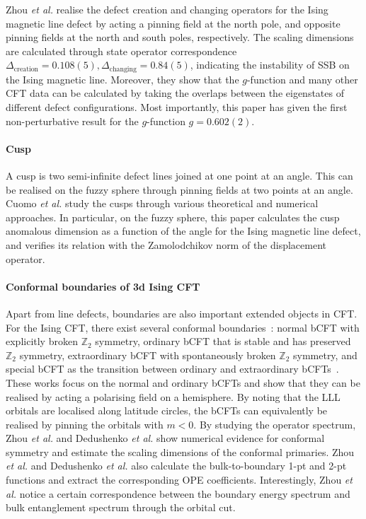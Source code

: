 \documentclass{timesjhep}
\begin{document}
Zhou \textit{et al.} realise the defect creation and changing operators for the Ising magnetic line defect by acting a pinning field at the north pole, and opposite pinning fields at the north and south poles, respectively. The scaling dimensions are calculated through state operator correspondence $\Delta_{\mathrm{creation}}=0.108(5),\Delta_{\mathrm{changing}}=0.84(5)$, indicating the instability of SSB on the Ising magnetic line. Moreover, they show that the $g$-function and many other CFT data can be calculated by taking the overlaps between the eigenstates of different defect configurations. Most importantly, this paper has given the first non-perturbative result for the $g$-function $g=0.602(2)$. 

\paragraph{Cusp~\cite{Cuomo2024}}

A cusp is two semi-infinite defect lines joined at one point at an angle. This can be realised on the fuzzy sphere through pinning fields at two points at an angle. Cuomo \textit{et al.} study the cusps through various theoretical and numerical approaches. In particular, on the fuzzy sphere, this paper calculates the cusp anomalous dimension as a function of the angle for the Ising magnetic line defect, and verifies its relation with the Zamolodchikov norm of the displacement operator. 

\paragraph{Conformal boundaries of 3d Ising CFT~\cite{Zhou2024Jul,Dedushenko2024}}

Apart from line defects, boundaries are also important extended objects in CFT. For the Ising CFT, there exist several conformal boundaries~: normal bCFT with explicitly broken $\mathbb{Z}_2$ symmetry, ordinary bCFT that is stable and has preserved $\mathbb{Z}_2$ symmetry, extraordinary bCFT with spontaneously broken $\mathbb{Z}_2$ symmetry, and special bCFT as the transition between ordinary and extraordinary bCFTs~\cite{Metlitski2020IsingBd,Krishnan2023IsingBd,Giombi2023IsingBd}. These works focus on the normal and ordinary bCFTs and show that they can be realised by acting a polarising field on a hemisphere. By noting that the LLL orbitals are localised along latitude circles, the bCFTs can equivalently be realised by pinning the orbitals with $m<0$. By studying the operator spectrum, Zhou \textit{et al.} and Dedushenko \textit{et al.} show numerical evidence for conformal symmetry and estimate the scaling dimensions of the conformal primaries. Zhou \textit{et al.} and Dedushenko \textit{et al.} also calculate the bulk-to-boundary 1-pt and 2-pt functions and extract the corresponding OPE coefficients. Interestingly, Zhou \textit{et al.} notice a certain correspondence between the boundary energy spectrum and bulk entanglement spectrum through the orbital cut. 
\end{document}
